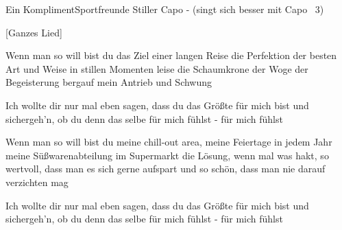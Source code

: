 \begin{song}{Ein Kompliment}{Sportfreunde Stiller}{ Capo - (singt sich besser mit Capo ~3)}

  [Ganzes Lied]

Wenn man so will bist du das Ziel einer langen Reise
die Perfektion der besten Art und Weise in stillen Momenten leise
die Schaumkrone der Woge der Begeisterung bergauf mein Antrieb und Schwung

Ich wollte dir nur mal eben sagen, dass du das Größte für mich bist
und sichergeh'n, ob du denn das selbe für mich fühlst - für mich fühlst

Wenn man so will bist du meine chill-out area, meine Feiertage in jedem Jahr
meine Süßwarenabteilung im Supermarkt
die Lösung, wenn mal was hakt, so wertvoll, dass man es sich gerne aufspart
und so schön, dass man nie darauf verzichten mag

Ich wollte dir nur mal eben sagen, dass du das Größte für mich bist
und sichergeh'n, ob du denn das selbe für mich fühlst - für mich fühlst


\end{song}